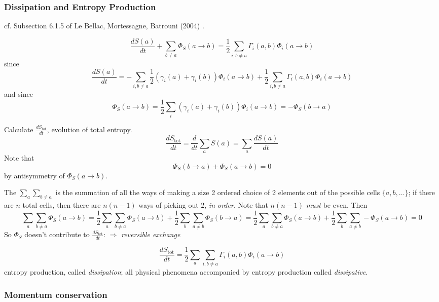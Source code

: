 \documentclass[10pt]{amsart}
\begin{document}
\begin{multicols*}{2}
\subsubsection{Dissipation and Entropy Production}

cf. Subsection 6.1.5 of Le Bellac, Mortessagne, Batrouni (2004) \cite{MLeBellacFMortessagneGBatrouni2004}. 





\begin{equation}
  \frac{dS(a)}{dt} + \sum_{b\neq a} \Phi_S(a\to b) = \frac{1}{2} \sum_{i,b\neq a} \Gamma_i(a,b) \Phi_i(a\to b)
\end{equation}
since 
\[
\frac{dS(a)}{dt} = -\sum_{i,b\neq a} \frac{1}{2} ( \gamma_i(a) + \gamma_i(b)) \Phi_i(a\to b) + \frac{1}{2} \sum_{i,b\neq a} \Gamma_i(a,b) \Phi_i(a\to b)
\]
and since
\begin{equation}
\Phi_S(a\to b) = \frac{1}{2} \sum_i (\gamma_i(a) + \gamma_i(b))\Phi_i(a\to b) = -\Phi_S(b\to a)
\end{equation}

Calculate $\frac{dS_{\text{tot}}}{dt}$, evolution of total entropy.  
\[
\frac{dS_{\text{tot}}}{dt} = \frac{d}{dt} \sum_a S(a) = \sum_a \frac{dS(a)}{dt}
\]
Note that 
\[
\Phi_S(b\to a) + \Phi_S(a\to b) = 0 
\]
by antisymmetry of $\Phi_S(a\to b)$. 

The $\sum_a \sum_{b\neq a}$ is the summation of all the ways of making a size 2 ordered choice of 2 elements out of the possible cells $\lbrace a, b, \dots \rbrace$; if there are $n$ total cells, then there are $n(n-1)$ ways of picking out 2, \emph{in order}.  Note that $n(n-1)$ \emph{must} be even.  Then
\[
\sum_a \sum_{b\neq a} \Phi_S(a\to b) = \frac{1}{2} \sum_a \sum_{b\neq a} \Phi_S(a\to b) + \frac{1}{2} \sum_b \sum_{a\neq b} \Phi_S(b\to a) = \frac{1}{2} \sum_a \sum_{b\neq a} \Phi_S(a\to b) + \frac{1}{2} \sum_b \sum_{a\neq b} - \Phi_S(a\to b) = 0 
\]
So $\Phi_S$ doesn't contribute to $\frac{d S_{\text{tot}}}{dt}$: $\Longrightarrow $ \emph{reversible exchange}

\[
\frac{dS_{\text{tot}}}{dt} = \frac{1}{2} \sum_a \sum_{i,b\neq a} \Gamma_i(a,b) \Phi_i(a\to b)
\]
entropy production, called \emph{dissipation}; all physical phenomena accompanied by entropy production called \emph{dissipative}.  



\subsubsection{Momentum conservation}


\end{multicols*}
\end{document}

